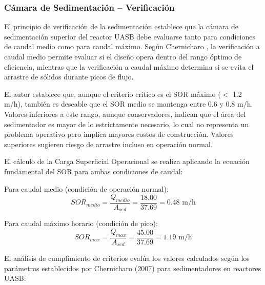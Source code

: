 \documentclass[12pt,a4paper]{article}
\begin{document}
\subsubsection{Cámara de Sedimentación -- Verificación}

El principio de verificación de la sedimentación establece que la cámara de sedimentación superior del reactor UASB debe evaluarse tanto para condiciones de caudal medio como para caudal máximo. Según Chernicharo \cite{chernicharo2007}, la verificación a caudal medio permite evaluar si el diseño opera dentro del rango óptimo de eficiencia, mientras que la verificación a caudal máximo determina si se evita el arrastre de sólidos durante picos de flujo.

El autor establece que, aunque el criterio crítico es el SOR máximo ($<$ 1.2 m/h), también es deseable que el SOR medio se mantenga entre 0.6 y 0.8 m/h. Valores inferiores a este rango, aunque conservadores, indican que el área del sedimentador es mayor de lo estrictamente necesario, lo cual no representa un problema operativo pero implica mayores costos de construcción. Valores superiores sugieren riesgo de arrastre incluso en operación normal.

El cálculo de la Carga Superficial Operacional se realiza aplicando la ecuación fundamental del SOR para ambas condiciones de caudal:

Para caudal medio (condición de operación normal):
\begin{equation}
SOR_{medio} = \frac{Q_{medio}}{A_{sed}} = \frac{18.00}{37.69} = 0.48 \text{ m/h}
\end{equation}

Para caudal máximo horario (condición de pico):
\begin{equation}
SOR_{max} = \frac{Q_{max}}{A_{sed}} = \frac{45.00}{37.69} = 1.19 \text{ m/h}
\end{equation}

El análisis de cumplimiento de criterios evalúa los valores calculados según los parámetros establecidos por Chernicharo (2007) para sedimentadores en reactores UASB:
\end{document}
